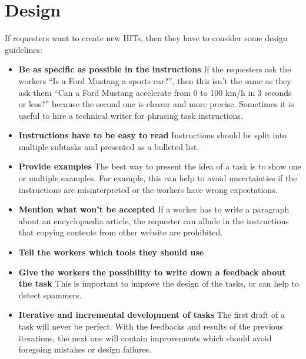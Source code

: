 \section{Design}
If requesters want to create new HITs, then they have to consider some design guidelines\cite{crowdsourcing_tutorial,mturk_bestpractices}: 
\begin{itemize}
\item \textbf{Be as specific as possible in the instructions} If the requesters ask the workers ``Is a Ford Mustang a sports car?'', then this isn't the same as they ask them ``Can a Ford Mustang accelerate from 0 to 100 km/h in 3 seconds or less?'' because the second one is clearer and more precise. Sometimes it is useful to hire a technical writer for phrasing task instructions. 
\item \textbf{Instructions have to be easy to read} Instructions should be split into multiple subtasks and presented as a bulleted list. 
\item \textbf{Provide examples} The best way to present the idea of a task is to show one or multiple examples. For example, this can help to avoid uncertainties if the instructions are misinterpreted or the workers have wrong expectations. 
\item \textbf{Mention what won't be accepted} If a worker has to write a paragraph about an encyclopaedia article, the requester can allude in the instructions that copying contents from other website are prohibited.
\item \textbf{Tell the workers which tools they should use} 
\item \textbf{Give the workers the possibility to write down a feedback about the task} This is important to improve the design of the tasks, or can help to detect spammers. 
\item \textbf{Iterative and incremental development of tasks} The first draft of a task will never be perfect. With the feedbacks and results of the previous iterations, the next one will contain improvements which should avoid foregoing mistakes or design failures.
\end{itemize}


